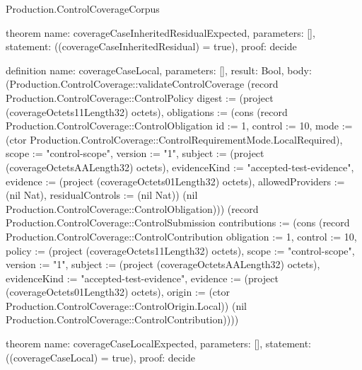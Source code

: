 \begin{lexlean}{Production.ControlCoverageCorpus}
\begin{semanticmodule}
theorem{
  name: coverageCaseInheritedResidualExpected,
  parameters: [],
  statement: ((coverageCaseInheritedResidual) = true),
  proof: decide{}
}

definition{
  name: coverageCaseLocal,
  parameters: [],
  result: Bool,
  body: (Production.ControlCoverage::validateControlCoverage (record Production.ControlCoverage::ControlPolicy {digest := (project (coverageOctets11Length32) octets), obligations := (cons (record Production.ControlCoverage::ControlObligation {id := 1, control := 10, mode := (ctor Production.ControlCoverage::ControlRequirementMode.LocalRequired), scope := "control-scope", version := "1", subject := (project (coverageOctetsAALength32) octets), evidenceKind := "accepted-test-evidence", evidence := (project (coverageOctets01Length32) octets), allowedProviders := (nil Nat), residualControls := (nil Nat)}) (nil Production.ControlCoverage::ControlObligation))}) (record Production.ControlCoverage::ControlSubmission {contributions := (cons (record Production.ControlCoverage::ControlContribution {obligation := 1, control := 10, policy := (project (coverageOctets11Length32) octets), scope := "control-scope", version := "1", subject := (project (coverageOctetsAALength32) octets), evidenceKind := "accepted-test-evidence", evidence := (project (coverageOctets01Length32) octets), origin := (ctor Production.ControlCoverage::ControlOrigin.Local)}) (nil Production.ControlCoverage::ControlContribution))}))
}

theorem{
  name: coverageCaseLocalExpected,
  parameters: [],
  statement: ((coverageCaseLocal) = true),
  proof: decide{}
}


\end{semanticmodule}
\end{lexlean}
